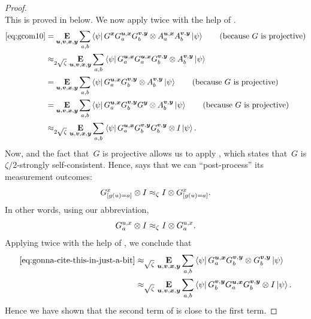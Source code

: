 \begin{proof}
\begin{equation}
\label{eq:gcom10}
\end{equation}
This is proved in  below.
We now apply  twice with the help of .
\begin{align}
\eqref{eq:gcom10}
&= \E_{\bu,\bv,\bx,\by} \sum_{a,b} \bra{\psi} G^{\bx}G^{\bu, \bx}_a  G^{\bv,\by}_b \ot A^{\bu,\bx}_a  A^{\bv,\by}_b \ket{\psi} \tag{because~$G$ is projective}\nonumber\\
&\approx_{2\sqrt{\zeta}} \E_{\bu,\bv,\bx,\by} \sum_{a,b} \bra{\psi}G^{\bu,\bx}_a G^{\bu,\bx}_a  G^{\bv,\by}_b \ot A^{\bv,\by}_b \ket{\psi} \nonumber\\
&= \E_{\bu,\bv,\bx,\by} \sum_{a,b} \bra{\psi} G^{\bu,\bx}_a  G^{\bv,\by}_b \ot A^{\bv,\by}_b \ket{\psi} \tag{because~$G$ is projective}\nonumber\\
&= \E_{\bu,\bv,\bx,\by} \sum_{a,b} \bra{\psi} G^{\bu,\bx}_a  G^{\bv,\by}_b G^{\by} \ot A^{\bv,\by}_b \ket{\psi} \tag{because~$G$ is projective}\nonumber\\
&\approx_{2\sqrt{\zeta}} \E_{\bu,\bv,\bx,\by} \sum_{a,b} \bra{\psi} G^{\bu,\bx}_a  G^{\bv,\by}_b G^{\bv, \by}_b \ot I \ket{\psi}. \label{eq:gonna-cite-this-in-just-a-bit}
\end{align} 
Now,  and the fact that~$G$ is projective allows us to apply , which states that~$G$ is $\zeta/2$-strongly self-consistent. Hence,  says that we can ``post-process'' its measurement outcomes:
\begin{equation*}
G^x_{[g(u)=a]} \ot I \approx_{\zeta} I \ot G^x_{[g(u)=a]}.
\end{equation*}
In other words, using our abbreviation,
\begin{equation}\label{eq:new-fact-that-i-derived}
G^{u,x}_a \ot I \approx_{\zeta} I \otimes G^{u,x}_a.
\end{equation}
Applying  twice with the help of ,
we conclude that
\begin{align*}
\eqref{eq:gonna-cite-this-in-just-a-bit}
&\approx_{\sqrt{\zeta}} \E_{\bu,\bv,\bx,\by} \sum_{a,b} \bra{\psi} G^{\bu,\bx}_a  G^{\bv,\by}_b  \ot G^{\bv, \by}_b \ket{\psi}\\
&\approx_{\sqrt{\zeta}} \E_{\bu,\bv,\bx,\by} \sum_{a,b} \bra{\psi} G^{\bv, \by}_b G^{\bu,\bx}_a  G^{\bv,\by}_b  \ot I \ket{\psi}.
\end{align*}
Hence we have shown that the second term of  is close to the first term.



\end{proof}
